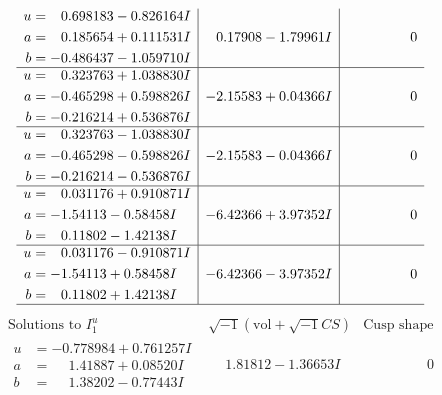 \documentclass[1p]{elsarticle_modified}
\theoremstyle{definition}
\newcommand{\I}{\sqrt{-1}}
\begin{document}
$$\begin{array}{c|c|c}
\begin{aligned}
u &= \phantom{-}0.698183 - 0.826164 I \\
a &= \phantom{-}0.185654 + 0.111531 I \\
b &= -0.486437 - 1.059710 I\end{aligned}
 & \phantom{-}0.17908 - 1.79961 I & \phantom{-0.000000 } 0 \\ \hline\begin{aligned}
u &= \phantom{-}0.323763 + 1.038830 I \\
a &= -0.465298 + 0.598826 I \\
b &= -0.216214 + 0.536876 I\end{aligned}
 & -2.15583 + 0.04366 I & \phantom{-0.000000 } 0 \\ \hline\begin{aligned}
u &= \phantom{-}0.323763 - 1.038830 I \\
a &= -0.465298 - 0.598826 I \\
b &= -0.216214 - 0.536876 I\end{aligned}
 & -2.15583 - 0.04366 I & \phantom{-0.000000 } 0 \\ \hline\begin{aligned}
u &= \phantom{-}0.031176 + 0.910871 I \\
a &= -1.54113 - 0.58458 I \\
b &= \phantom{-}0.11802 - 1.42138 I\end{aligned}
 & -6.42366 + 3.97352 I & \phantom{-0.000000 } 0 \\ \hline\begin{aligned}
u &= \phantom{-}0.031176 - 0.910871 I \\
a &= -1.54113 + 0.58458 I \\
b &= \phantom{-}0.11802 + 1.42138 I\end{aligned}
 & -6.42366 - 3.97352 I & \phantom{-0.000000 } 0\\
 \hline 
 \end{array}$$\newpage$$\begin{array}{c|c|c}  
\text{Solutions to }I^u_{1}& \I (\text{vol} + \sqrt{-1}CS) & \text{Cusp shape}\\
 \hline 
\begin{aligned}
u &= -0.778984 + 0.761257 I \\
a &= \phantom{-}1.41887 + 0.08520 I \\
b &= \phantom{-}1.38202 - 0.77443 I\end{aligned}
 & \phantom{-}1.81812 - 1.36653 I & \phantom{-0.000000 } 0 \\ \hline\begin{aligned}

\end{aligned}
\end{array}$$
\end{document}
